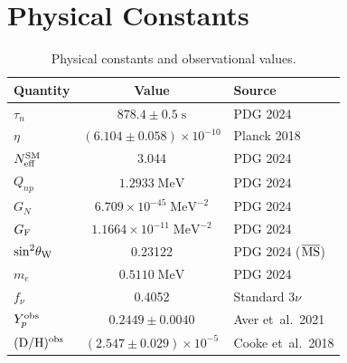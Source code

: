 \section{Physical Constants}\label{app:constants}

\begin{table}[tbp]
\centering
\caption{Physical constants and observational values.}
\begin{tabular}{lcl}
\toprule
Quantity & Value & Source \\
\midrule
$\tau_n$ & $878.4 \pm 0.5\;\mathrm{s}$ & PDG 2024 \\
$\eta$ & $(6.104 \pm 0.058) \times 10^{-10}$ & Planck 2018 \\
$N_{\rm eff}^{\rm SM}$ & 3.044 & PDG 2024 \\
$Q_{np}$ & $1.2933\;\mathrm{MeV}$ & PDG 2024 \\
$G_N$ & $6.709 \times 10^{-45}\;\mathrm{MeV}^{-2}$ & PDG 2024 \\
$G_{\rm F}$ & $1.1664 \times 10^{-11}\;\mathrm{MeV}^{-2}$ & PDG 2024 \\
$\sin^2\!\theta_{\rm W}$ & 0.23122 & PDG 2024 ($\overline{\rm MS}$) \\
$m_e$ & $0.5110\;\mathrm{MeV}$ & PDG 2024 \\
$f_\nu$ & 0.4052 & Standard 3$\nu$ \\
$Y_p^{\rm obs}$ & $0.2449 \pm 0.0040$ & Aver et~al.\ 2021 \\
$(\mathrm{D/H})^{\rm obs}$ & $(2.547 \pm 0.029) \times 10^{-5}$ & Cooke et~al.\ 2018 \\
\bottomrule
\end{tabular}
\end{table}

